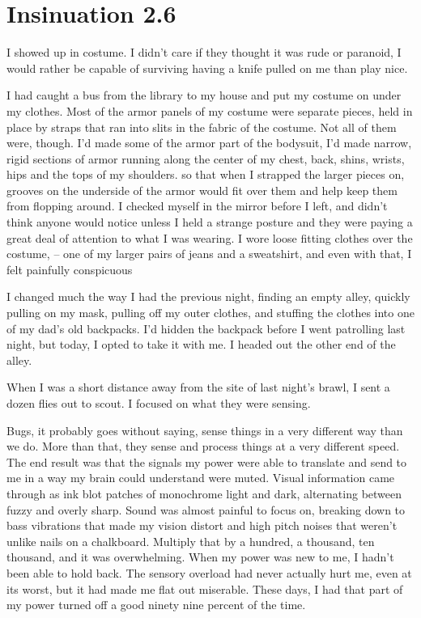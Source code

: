 \chapter{Insinuation 2.6}

I showed up in costume. I didn't care if they thought it was rude or paranoid, I would rather be capable of surviving having a knife pulled on me than play nice.

I had caught a bus from the library to my house and put my costume on under my clothes. Most of the armor panels of my costume were separate pieces, held in place by straps that ran into slits in the fabric of the costume. Not all of them were, though. I'd made some of the armor part of the bodysuit, I'd made narrow, rigid sections of armor running along the center of my chest, back, shins, wrists, hips and the tops of my shoulders. so that when I strapped the larger pieces on, grooves on the underside of the armor would fit over them and help keep them from flopping around. I checked myself in the mirror before I left, and didn't think anyone would notice unless I held a strange posture and they were paying a great deal of attention to what I was wearing. I wore loose fitting clothes over the costume, -- one of my larger pairs of jeans and a sweatshirt, and even with that, I felt painfully conspicuous

I changed much the way I had the previous night, finding an empty alley, quickly pulling on my mask, pulling off my outer clothes, and stuffing the clothes into one of my dad's old backpacks. I'd hidden the backpack before I went patrolling last night, but today, I opted to take it with me. I headed out the other end of the alley.

When I was a short distance away from the site of last night's brawl, I sent a dozen flies out to scout. I focused on what they were sensing.

Bugs, it probably goes without saying, sense things in a very different way than we do. More than that, they sense and process things at a very different speed. The end result was that the signals my power were able to translate and send to me in a way my brain could understand were muted. Visual information came through as ink blot patches of monochrome light and dark, alternating between fuzzy and overly sharp. Sound was almost painful to focus on, breaking down to bass vibrations that made my vision distort and high pitch noises that weren't unlike nails on a chalkboard. Multiply that by a hundred, a thousand, ten thousand, and it was overwhelming. When my power was new to me, I hadn't been able to hold back. The sensory overload had never actually hurt me, even at its worst, but it had made me flat out miserable. These days, I had that part of my power turned off a good ninety nine percent of the time.

